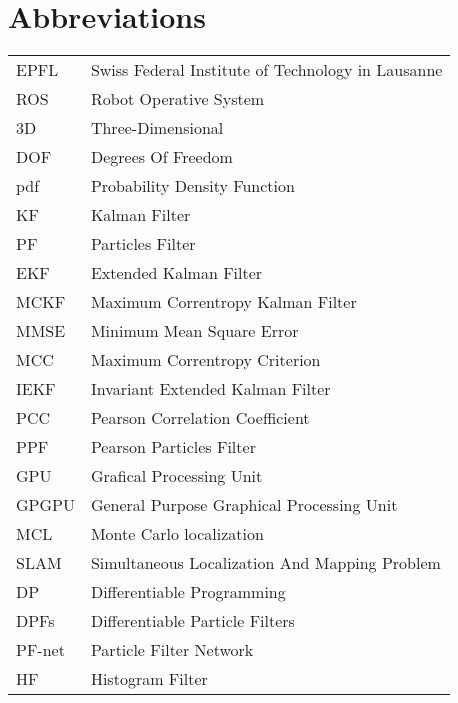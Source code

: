 \section{Abbreviations}
\begin{flushleft}
\begin{tabular}{l l}
EPFL & Swiss Federal Institute of Technology in Lausanne\\
ROS & Robot Operative System\\
3D & Three-Dimensional\\
DOF & Degrees Of Freedom\\
pdf & Probability Density Function\\
KF & Kalman Filter\\
PF & Particles Filter\\
EKF & Extended Kalman Filter\\
MCKF & Maximum Correntropy Kalman Filter\\
MMSE & Minimum Mean Square Error\\
MCC & Maximum Correntropy Criterion\\
IEKF & Invariant Extended Kalman Filter\\
PCC & Pearson Correlation Coefficient\\
PPF & Pearson Particles Filter\\
GPU & Grafical Processing Unit\\
GPGPU & General Purpose Graphical Processing Unit\\
MCL & Monte Carlo localization\\
SLAM & Simultaneous Localization And Mapping Problem\\
DP & Differentiable Programming\\
DPFs & Differentiable Particle Filters\\
PF-net & Particle Filter Network\\
HF & Histogram Filter\\

\end{tabular}
\end{flushleft}

